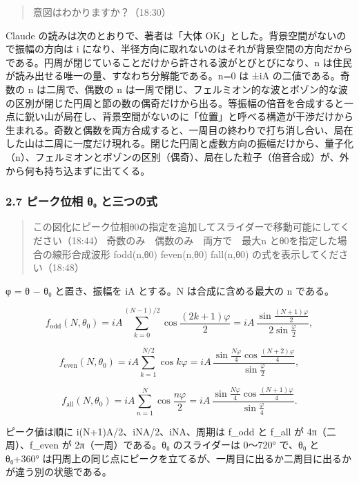 \documentclass[
  a4paper,
]{ltjsarticle}
\begin{document}
\begin{quote}
意図はわかりますか？（18:30）
\end{quote}

Claude の読みは次のとおりで、著者は「大体
OK」とした。背景空間がないので振幅の方向は i
になり、半径方向に取れないのはそれが背景空間の方向だからである。円周が閉じていることだけから許される波がとびとびになり、n
は住民が読み出せる唯一の量、すなわち分解能である。n=0 は ±iA
の二値である。奇数の n は二周で、偶数の n
は一周で閉じ、フェルミオン的な波とボゾン的な波の区別が閉じた円周と節の数の偶奇だけから出る。等振幅の倍音を合成すると一点に鋭い山が局在し、背景空間がないのに「位置」と呼べる構造が干渉だけから生まれる。奇数と偶数を両方合成すると、一周目の終わりで打ち消し合い、局在した山は二周に一度だけ現れる。閉じた円周と虚数方向の振幅だけから、量子化（n）、フェルミオンとボゾンの区別（偶奇）、局在した粒子（倍音合成）が、外から何も持ち込まずに出てくる。

\subsubsection{2.7 ピーク位相 θ₀
と三つの式}\label{ux30d4ux30fcux30afux4f4dux76f8-ux3b8ux2080-ux3068ux4e09ux3064ux306eux5f0f}

\begin{quote}
この図化にピーク位相θ0の指定を追加してスライダーで移動可能にしてください（18:44）
奇数のみ　偶数のみ　両方で　最大n とθ0を指定した場合の線形合成波形
fodd(n,θ0) feven(n,θ0) fall(n,θ0) の式を表示してください（18:48）
\end{quote}

φ = θ − θ₀ と置き、振幅を iA とする。N は合成に含める最大の n である。

\[
f_{\mathrm{odd}}(N,\theta_0)=iA\sum_{k=0}^{(N-1)/2}\cos\frac{(2k+1)\varphi}{2}=iA\,\frac{\sin\frac{(N+1)\varphi}{2}}{2\sin\frac{\varphi}{2}},
\]

\[
f_{\mathrm{even}}(N,\theta_0)=iA\sum_{k=1}^{N/2}\cos k\varphi=iA\,\frac{\sin\frac{N\varphi}{4}\cos\frac{(N+2)\varphi}{4}}{\sin\frac{\varphi}{2}},
\]

\[
f_{\mathrm{all}}(N,\theta_0)=iA\sum_{n=1}^{N}\cos\frac{n\varphi}{2}=iA\,\frac{\sin\frac{N\varphi}{4}\cos\frac{(N+1)\varphi}{4}}{\sin\frac{\varphi}{4}}.
\]

ピーク値は順に i(N+1)A/2、iNA/2、iNA、周期は f\_odd と f\_all が
4π（二周）、f\_even が 2π（一周）である。θ₀ のスライダーは 0〜720°
で、θ₀ と θ₀+360°
は円周上の同じ点にピークを立てるが、一周目に出るか二周目に出るかが違う別の状態である。
\end{document}
